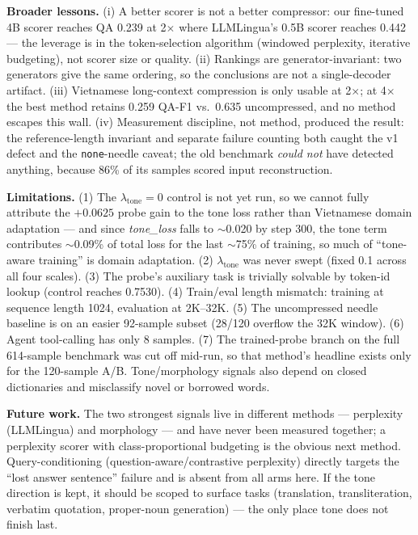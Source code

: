 \documentclass[runningheads]{llncs}
\newcommand{\tone}[1]{\textit{#1}}
\begin{document}
\textbf{Broader lessons.} (i) A better scorer is not a better compressor: our fine-tuned 4B scorer reaches QA 0.239 at 2$\times$ where LLMLingua's 0.5B scorer reaches 0.442 --- the leverage is in the token-selection algorithm (windowed perplexity, iterative budgeting), not scorer size or quality. (ii) Rankings are generator-invariant: two generators give the same ordering, so the conclusions are not a single-decoder artifact. (iii) Vietnamese long-context compression is only usable at 2$\times$; at 4$\times$ the best method retains 0.259 QA-F1 vs.\ 0.635 uncompressed, and no method escapes this wall. (iv) Measurement discipline, not method, produced the result: the reference-length invariant and separate failure counting both caught the v1 defect and the \texttt{none}-needle caveat; the old benchmark \emph{could not} have detected anything, because 86\% of its samples scored input reconstruction.

\textbf{Limitations.} (1) The $\lambda_{\text{tone}}{=}0$ control is not yet run, so we cannot fully attribute the $+0.0625$ probe gain to the tone loss rather than Vietnamese domain adaptation --- and since \tone{tone\_loss} falls to $\sim$0.020 by step 300, the tone term contributes $\sim$0.09\% of total loss for the last $\sim$75\% of training, so much of ``tone-aware training'' is domain adaptation. (2) $\lambda_{\text{tone}}$ was never swept (fixed 0.1 across all four scales). (3) The probe's auxiliary task is trivially solvable by token-id lookup (control reaches 0.7530). (4) Train/eval length mismatch: training at sequence length 1024, evaluation at 2K--32K. (5) The uncompressed needle baseline is on an easier 92-sample subset (28/120 overflow the 32K window). (6) Agent tool-calling has only 8 samples. (7) The trained-probe branch on the full 614-sample benchmark was cut off mid-run, so that method's headline exists only for the 120-sample A/B. Tone/morphology signals also depend on closed dictionaries and misclassify novel or borrowed words.

\textbf{Future work.} The two strongest signals live in different methods --- perplexity (LLMLingua) and morphology --- and have never been measured together; a perplexity scorer with class-proportional budgeting is the obvious next method. Query-conditioning (question-aware/contrastive perplexity) directly targets the ``lost answer sentence'' failure and is absent from all arms here. If the tone direction is kept, it should be scoped to surface tasks (translation, transliteration, verbatim quotation, proper-noun generation) --- the only place tone does not finish last.
\end{document}
